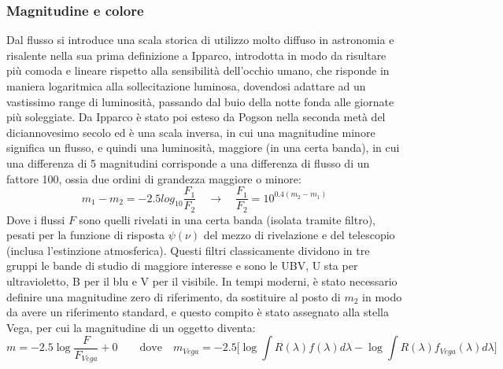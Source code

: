 \documentclass[a4paper,twoside,openany,notitlepage]{book}
\theoremstyle{definition}
\theoremstyle{plain}
\begin{document}
\subsubsection*{Magnitudine e colore}
Dal flusso si introduce una scala storica di utilizzo molto diffuso in astronomia e risalente nella sua prima definizione a Ipparco, introdotta in modo da risultare più comoda e lineare rispetto alla sensibilità dell'occhio umano, che risponde in maniera logaritmica alla sollecitazione luminosa, dovendosi adattare ad un vastissimo range di luminosità, passando dal buio della notte fonda alle giornate più soleggiate. Da Ipparco è stato poi esteso da Pogson nella seconda metà del diciannovesimo secolo ed è una scala inversa, in cui una magnitudine minore significa un flusso, e quindi una luminosità, maggiore (in una certa banda), in cui una differenza di 5 magnitudini corrisponde a una differenza di flusso di un fattore 100, ossia due ordini di grandezza maggiore o minore:
\begin{equation*}
	m_1-m_2 = -2.5log_{10}\frac{F_1}{F_2} \quad \longrightarrow \quad \frac{F_1}{F_2} = 10^{0.4(m_2-m_1)}
\end{equation*}
Dove i flussi $F$ sono quelli rivelati in una certa banda (isolata tramite filtro), pesati per la funzione di risposta $\psi(\nu)$ del mezzo di rivelazione e del telescopio (inclusa l'estinzione atmosferica). Questi filtri classicamente dividono in tre gruppi le bande di studio di maggiore interesse e sono le UBV, U sta per ultravioletto, B per il blu e V per il visibile.
In tempi moderni, è stato necessario definire una magnitudine zero di riferimento, da sostituire al posto di $m_2$ in modo da avere un riferimento standard, e questo compito è stato assegnato alla stella Vega, per cui la magnitudine di un oggetto diventa:
\begin{equation*}
	m = -2.5\log\frac{F}{F_{Vega}} + 0 \qquad \text{dove} \quad
	m_{Vega} = -2.5 \biggl[ \log\int R(\lambda)f(\lambda)d\lambda - \log\int R(\lambda)f_{Vega}(\lambda)d\lambda \biggr]
\end{equation*}
\end{document}
